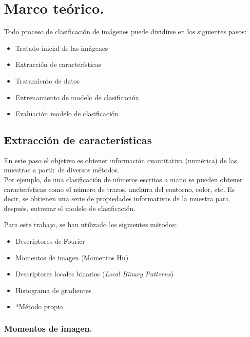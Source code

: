 \chapter{Marco teórico.} \label{cap:marco_teorico}


Todo proceso de clasificación de imágenes puede dividirse en los siguientes pasos:

\begin{itemize}
	\item Tratado inicial de las imágenes
	\item Extracción de características
	\item Tratamiento de datos
	\item Entrenamiento de modelo de clasificación
	\item Evaluación modelo de clasificación
\end{itemize}

\section{Extracción de características}
\label{section:Extracción de catacterísticas}

En este paso el objetivo es obtener información cuantitativa (numérica) de las muestras a partir de diversos métodos.\\ Por ejemplo, de una clasificación de números escritos a mano se pueden obtener características como el número de trazos, anchura del contorno, color, etc. Es decir, se obtienen una serie de propiedades informativas de la muestra para, después, entrenar el modelo de clasificación. 

Para este trabajo, se han utilizado los siguientes métodos:
\begin{itemize}
	\item Descriptores de Fourier
	\item Momentos de imagen (Momentos Hu)
	\item Descriptores locales binarios (\textit{Local Binary Patterns})
	\item Histograma de gradientes
	\item *Método propio
\end{itemize}

\subsection{Momentos de imagen.}

